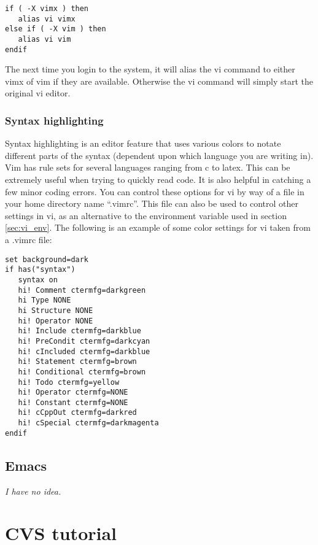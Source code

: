 \documentclass[11pt, letterpaper]{article}
\begin{document}
\begin{verbatim}
if ( -X vimx ) then
   alias vi vimx
else if ( -X vim ) then
   alias vi vim
endif
\end{verbatim}

The next time you login to the system, it will alias the vi command
to either vimx of vim if they are available.  Otherwise the vi command will simply
start the original vi editor.

\subsubsection{Syntax highlighting}

Syntax highlighting is an editor feature that uses various colors to
notate different parts of the syntax (dependent upon which language you
are writing in).  Vim has rule sets for several languages ranging from c
to latex.  This can be extremely useful when trying to quickly
read code.  It is also helpful in catching a few minor coding errors.
You can control these options for vi by way of a file in your home directory name
``.vimrc''.  This file can also be used to control other settings in vi,
as an alternative to the environment variable used in section \ref{sec:vi_env}.  The following is an example
of some color settings for vi taken from a .vimrc file:

\begin{verbatim}
set background=dark
if has("syntax")
   syntax on
   hi! Comment ctermfg=darkgreen
   hi Type NONE
   hi Structure NONE
   hi! Operator NONE
   hi! Include ctermfg=darkblue
   hi! PreCondit ctermfg=darkcyan
   hi! cIncluded ctermfg=darkblue
   hi! Statement ctermfg=brown
   hi! Conditional ctermfg=brown
   hi! Todo ctermfg=yellow
   hi! Operator ctermfg=NONE
   hi! Constant ctermfg=NONE
   hi! cCppOut ctermfg=darkred
   hi! cSpecial ctermfg=darkmagenta
endif
\end{verbatim}

\subsection{Emacs}

\emph{I have no idea.}



\section{CVS tutorial}
\end{document}

